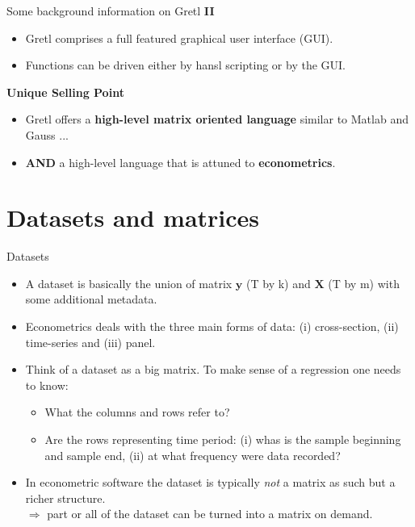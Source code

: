 \documentclass{beamer}[11pt]
\begin{document}
\begin{frame}{Some background information on Gretl \textbf{II}}
	\begin{itemize}
		\item Gretl comprises a full featured graphical user interface (GUI).
		\item Functions can be driven either by hansl scripting or by the GUI.
	\end{itemize}
	\vspace{0.5cm}
	\textbf{Unique Selling Point}
	
	\begin{itemize}
		\item Gretl offers a \textbf{high-level matrix oriented language} similar to Matlab and Gauss ...
		\item \textbf{AND} a high-level language that is attuned to \textbf{econometrics}.
	\end{itemize}
	
\end{frame}

\section{Datasets and matrices}

\begin{frame}{Datasets}
	\begin{itemize}
		\item A dataset is basically the union of matrix $ \textbf{y} $ (T by k) and $ \textbf{X} $ (T by m) with some additional metadata.
		\item Econometrics deals with the three main forms of data: (i) cross-section, (ii) time-series and (iii) panel.
		\item Think of a dataset as a big matrix. To make sense of a regression one needs to know:
		\begin{itemize}
			\item What the columns and rows refer to?
			\item Are the rows representing time period: (i) whas is the sample beginning and sample end, (ii) at what frequency were data recorded?
		\end{itemize}
		\item In econometric software the dataset is typically \textit{not} a matrix as such but a richer structure. \\
		$ \Rightarrow $ part or all of the dataset can be turned into a matrix on demand.
	\end{itemize}
\end{frame}
\end{document}
